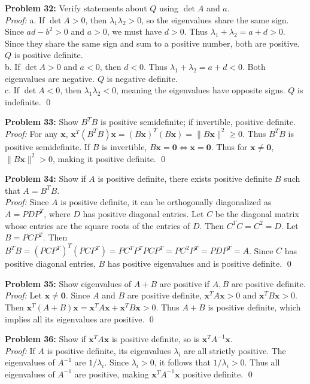 \documentclass[11pt, letterpaper]{article}
\theoremstyle{definition}
\theoremstyle{remark}
\newcommand{\x}{\mathbf{x}}
\begin{document}
\textbf{Problem 32:} Verify statements about $Q$ using $\det A$ and $a$. \\
\textit{Proof:} 
a. If $\det A > 0$, then $\lambda_1 \lambda_2 > 0$, so the eigenvalues share the same sign. Since $ad - b^2 > 0$ and $a > 0$, we must have $d > 0$. Thus $\lambda_1 + \lambda_2 = a+d > 0$. Since they share the same sign and sum to a positive number, both are positive. $Q$ is positive definite. \\
b. If $\det A > 0$ and $a < 0$, then $d < 0$. Thus $\lambda_1 + \lambda_2 = a+d < 0$. Both eigenvalues are negative. $Q$ is negative definite. \\
c. If $\det A < 0$, then $\lambda_1 \lambda_2 < 0$, meaning the eigenvalues have opposite signs. $Q$ is indefinite. \qed

\textbf{Problem 33:} Show $B^T B$ is positive semidefinite; if invertible, positive definite. \\
\textit{Proof:} For any $\x$, $\x^T (B^T B) \x = (B\x)^T (B\x) = \|B\x\|^2 \ge 0$. Thus $B^T B$ is positive semidefinite. If $B$ is invertible, $B\x = \mathbf{0} \iff \x = \mathbf{0}$. Thus for $\x \neq \mathbf{0}$, $\|B\x\|^2 > 0$, making it positive definite. \qed

\textbf{Problem 34:} Show if $A$ is positive definite, there exists positive definite $B$ such that $A = B^T B$. \\
\textit{Proof:} Since $A$ is positive definite, it can be orthogonally diagonalized as $A = P D P^T$, where $D$ has positive diagonal entries. Let $C$ be the diagonal matrix whose entries are the square roots of the entries of $D$. Then $C^T C = C^2 = D$. Let $B = P C P^T$. Then $B^T B = (P C P^T)^T (P C P^T) = P C^T P^T P C P^T = P C^2 P^T = P D P^T = A$. Since $C$ has positive diagonal entries, $B$ has positive eigenvalues and is positive definite. \qed

\textbf{Problem 35:} Show eigenvalues of $A+B$ are positive if $A, B$ are positive definite. \\
\textit{Proof:} Let $\x \neq \mathbf{0}$. Since $A$ and $B$ are positive definite, $\x^T A \x > 0$ and $\x^T B \x > 0$. Then $\x^T (A+B) \x = \x^T A \x + \x^T B \x > 0$. Thus $A+B$ is positive definite, which implies all its eigenvalues are positive. \qed

\textbf{Problem 36:} Show if $\x^T A \x$ is positive definite, so is $\x^T A^{-1} \x$. \\
\textit{Proof:} If $A$ is positive definite, its eigenvalues $\lambda_i$ are all strictly positive. The eigenvalues of $A^{-1}$ are $1/\lambda_i$. Since $\lambda_i > 0$, it follows that $1/\lambda_i > 0$. Thus all eigenvalues of $A^{-1}$ are positive, making $\x^T A^{-1} \x$ positive definite. \qed
\end{document}
